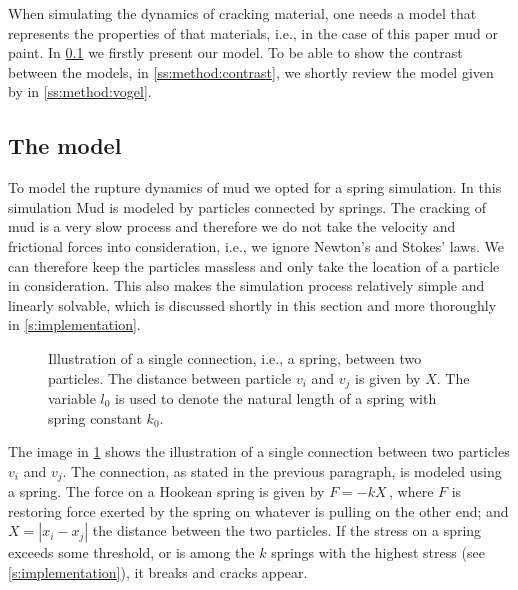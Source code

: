 
When simulating the dynamics of cracking material, one needs a model that represents the properties of that materials, i.e., in the case of this paper mud or paint. In \cref{ss:method:model} we firstly present our model. To be able to show the contrast between the models, in \cref{ss:method:contrast}, we shortly review the model given by \citeauthor{vogel2005studies2} in \cref{ss:method:vogel}.

\subsection{The model}\label{ss:method:model}

To model the rupture dynamics of mud we opted for a spring simulation. In this simulation Mud is modeled by particles connected by springs. The cracking of mud is a very slow process and therefore we do not take the velocity and frictional forces into consideration, i.e., we ignore Newton's and Stokes' laws. We can therefore keep the particles massless and only take the location of a particle in consideration. This also makes the simulation process relatively simple and linearly solvable, which is discussed shortly in this section and more thoroughly in \cref{s:implementation}.

\begin{figure}
	\centering
	\singleSpring
	\caption{Illustration of a single connection, i.e., a spring, between two particles. The distance between particle $v_i$ and $v_j$ is given by $X$. The variable $l_0$ is used to denote the natural length of a spring with spring constant $k_0$.}
	\label{fig:method:spring}
\end{figure}

The image in \cref{fig:method:spring} shows the illustration of a single connection between two particles $v_i$ and $v_j$. The connection, as stated in the previous paragraph, is modeled using a spring. The force on a Hookean spring is given by $F = -k X\,$, where $F$ is restoring force exerted by the spring on whatever is pulling on the other end; and $X = |x_i - x_j|$ the distance between the two particles. If the stress on a spring exceeds some threshold, or is among the $k$ springs with the highest stress (see \cref{s:implementation}), it breaks and cracks appear.

